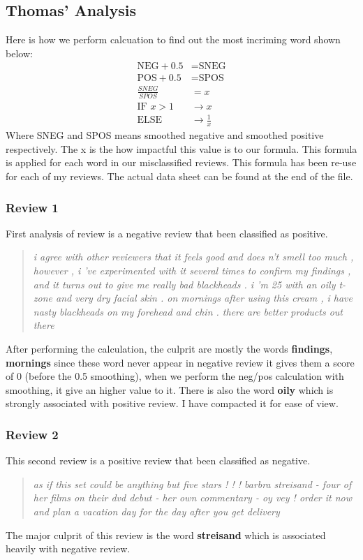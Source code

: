\documentclass[runningheads]{llncs}
\begin{document}
    \subsection{Thomas' Analysis}
    Here is how we perform calcuation to find out the most incriming word shown below:
    $$
    \begin{aligned}
        \text{NEG} + 0.5 &= \text{SNEG}\\
        \text{POS} + 0.5 &= \text{SPOS}\\
        \frac{SNEG}{SPOS} &= x\\
        \text{IF } x > 1 &\rightarrow x\\
        \text{ELSE } &\rightarrow \frac{1}{x}
    \end{aligned}
    $$
    Where SNEG and SPOS means smoothed negative and smoothed positive respectively. The x is the how impactful this value is to our formula. This formula is applied for each word in our misclassified reviews. This formula has been re-use for each of my reviews. The actual data sheet can be found at the end of the file.
    \subsubsection{Review 1}
    First analysis of review is a negative review that been classified as positive.
    \begin{quotation}
        \textit{i agree with other reviewers that it feels good and does n't smell too much , however , i 've experimented with it several times to confirm my findings , and it turns out to give me really bad blackheads . i 'm 25 with an oily t-zone and very dry facial skin . on mornings after using this cream , i have nasty blackheads on my forehead and chin . there are better products out there} 
    \end{quotation}
    After performing the calculation, the culprit are mostly the words \textbf{findings}, \textbf{mornings} since these word never appear in negative review it gives them a score of 0 (before the 0.5 smoothing), when we perform the neg/pos calculation with smoothing, it give an higher value to it. There is also the word \textbf{oily} which is strongly associated with positive review. I have compacted it for ease of view.
    \subsubsection{Review 2}
    This second review is a positive review that been classified as negative.
    \begin{quotation}
        \textit{as if this set could be anything but five stars ! ! ! barbra streisand - four of her films on their dvd debut - her own commentary - oy vey ! order it now and plan a vacation day for the day after you get delivery }
    \end{quotation}
    The major culprit of this review is the word \textbf{streisand} which is associated heavily with negative review. 
\end{document}
